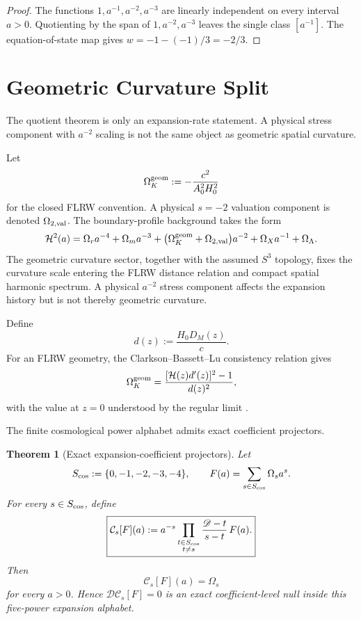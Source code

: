 \documentclass[aps,prd,reprint,onecolumn,nofootinbib,superscriptaddress,showkeys]{revtex4-2}
\numberwithin{equation}{section}
\theoremstyle{definition}
\theoremstyle{plain}
\newtheorem{theorem}{Theorem}[section]
\newcommand{\Dil}{\mathscr D}
\begin{document}
\begin{proof}
The functions \(1,a^{-1},a^{-2},a^{-3}\) are linearly independent on every interval \(a>0\).  Quotienting by the span of \(1,a^{-2},a^{-3}\) leaves the single class \([a^{-1}]\).  The equation-of-state map gives \(w=-1-(-1)/3=-2/3\).
\end{proof}

\section{Geometric Curvature Split}

The quotient theorem is only an expansion-rate statement.  A physical stress component with \(a^{-2}\) scaling is not the same object as geometric spatial curvature.

Let
\begin{equation}
\Omega_K^{\rm geom}:=-\frac{c^2}{A_0^2H_0^2}
\end{equation}
for the closed FLRW convention.  A physical \(s=-2\) valuation component is denoted \(\Omega_{2,\rm val}\).  The boundary-profile background takes the form
\begin{equation}
\mathcal H^2(a)=
\Omega_ra^{-4}
+\Omega_ma^{-3}
+\bigl(\Omega_K^{\rm geom}+\Omega_{2,\rm val}\bigr)a^{-2}
+\Omega_Xa^{-1}
+\Omega_\Lambda.
\end{equation}
The geometric curvature sector, together with the assumed \(S^3\) topology, fixes the curvature scale entering the FLRW distance relation and compact spatial harmonic spectrum.  A physical \(a^{-2}\) stress component affects the expansion history but is not thereby geometric curvature.

Define
\begin{equation}
d(z):=\frac{H_0D_M(z)}{c}.
\end{equation}
For an FLRW geometry, the Clarkson--Bassett--Lu consistency relation gives
\begin{equation}
\Omega_K^{\rm geom}
=
\frac{[\mathcal H(z)d'(z)]^2-1}{d(z)^2},
\end{equation}
with the value at \(z=0\) understood by the regular limit \cite{ClarksonBassettLu2008}.

The finite cosmological power alphabet admits exact coefficient projectors.

\begin{theorem}[Exact expansion-coefficient projectors]\label{thm:expansion-projectors}
Let
\begin{equation}
S_{\rm cos}:=\{0,-1,-2,-3,-4\},
\qquad
F(a)=\sum_{s\in S_{\rm cos}}\Omega_s a^s.
\end{equation}
For every \(s\in S_{\rm cos}\), define
\begin{equation}
\boxed{
\mathcal C_s[F](a)
:=
a^{-s}
\prod_{\substack{t\in S_{\rm cos}\\t\ne s}}
\frac{\Dil-t}{s-t}\,F(a).
}
\end{equation}
Then
\begin{equation}
\boxed{\mathcal C_s[F](a)=\Omega_s}
\end{equation}
for every \(a>0\).  Hence \(\Dil\mathcal C_s[F]=0\) is an exact coefficient-level null inside this five-power expansion alphabet.
\end{theorem}
\end{document}
